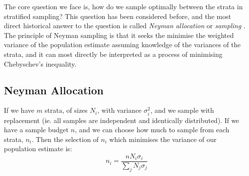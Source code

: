 The core question we face is, how do we sample optimally between the strata in stratified sampling?
This question has been considered before, and the most direct historical answer to the question is called \textit{Neyman allocation} or \textit{sampling} \cite{1938.10503378,10.2307/23339498}.
The principle of Neyman sampling is that it seeks the minimise the weighted variance of the population estimate assuming knowledge of the variances of the strata, and it can most directly be interpreted as a process of minimising Chebyschev's inequality.

\subsection{Neyman Allocation}\label{sec:neyman_sampling}

\begin{theorem}\label{thm:neyman_selection}
If we have $m$ strata, of sizes $N_i$, with variance $\sigma_i^2$, and we sample with replacement (ie. all samples are independent and identically distributed). If we have a sample budget $n$, and we can choose how much to sample from each strata, $n_i$.
Then the selection of $n_i$ which minimises the variance of our population estimate is:
$$n_i = \frac{nN_i\sigma_i}{\sum_jN_j\sigma_j}$$
\end{theorem}

